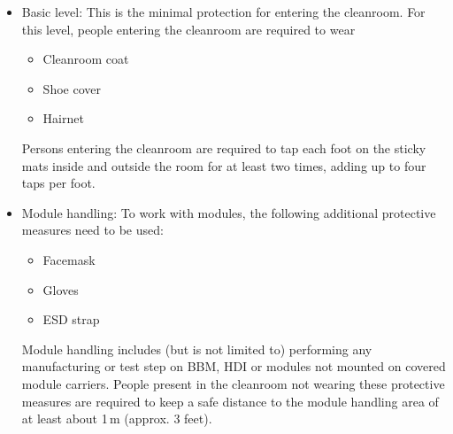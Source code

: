 \documentclass[12pt]{unlsilabsop}
\begin{document}
\begin{itemize}
    \item Basic level: This is the minimal protection for entering the cleanroom. For this level, people entering the cleanroom are required to wear
    \begin{itemize}
	\item Cleanroom coat
	\item Shoe cover
	\item Hairnet
    \end{itemize}
    Persons entering the cleanroom are required to tap each foot on the sticky mats inside and outside the room for at least two times, adding up to four taps per foot.
    \item Module handling: To work with modules, the following additional protective measures need to be used:
    \begin{itemize}
	\item Facemask
	\item Gloves
	\item ESD strap
    \end{itemize}
    Module handling includes (but is not limited to) performing any manufacturing or test step on BBM, HDI or modules not mounted on covered module carriers. People present in the cleanroom not wearing these protective measures are required to keep a safe distance to the module handling area of at least about 1\,m (approx. 3 feet).
\end{itemize}
\end{document}
